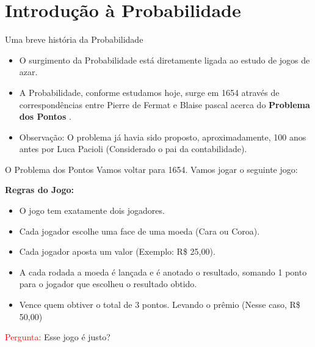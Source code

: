 \section{Introdução à Probabilidade}

\begin{frame}{Uma breve história da Probabilidade}
    \begin{itemize}
        \item O surgimento da Probabilidade está diretamente ligada ao estudo de jogos de azar. 
        \pause 
        \item A Probabilidade, conforme estudamos hoje, surge em 1654 através de correspondências entre Pierre de Fermat e Blaise pascal acerca do \textbf{Problema dos Pontos} . 
        \pause

        \item Observação: O problema já havia sido proposto, aproximadamente, 100 anos antes por Luca Pacioli (Considerado o pai da contabilidade). 
    \end{itemize}
\end{frame}

\begin{frame}{O Problema dos Pontos}
    Vamos voltar para 1654. 
    \pause
    Vamos jogar o seguinte jogo:

    \textbf{Regras do Jogo:}
    \begin{itemize}
        \item O jogo tem exatamente dois jogadores. 
        \pause
        \item Cada jogador escolhe uma face de uma moeda (Cara ou Coroa).
        \pause
        \item Cada jogador aposta um valor (Exemplo: R\$ 25,00).
        \pause
        \item A cada rodada a moeda é lançada e é anotado o resultado, somando 1 ponto para o jogador que escolheu o resultado obtido.
        \pause
        \item Vence quem obtiver o total de 3 pontos. Levando o prêmio (Nesse caso, R\$ 50,00)
    \end{itemize}
\pause
    \textcolor{red}{Pergunta:} Esse jogo é justo?
\end{frame}

